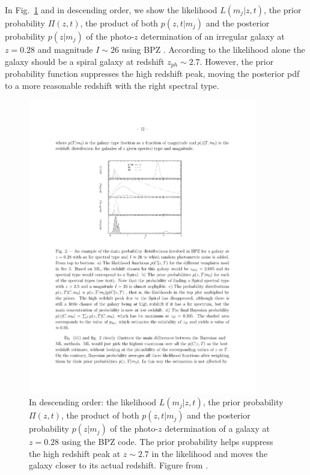 In Fig.~\ref{fig:prior_parts} and in descending order, we show the likelihood $L(m_j|z,t)$, the prior probability $\Pi(z,t)$, the product of both $p(z,t|m_j)$ and the posterior probability $p(z|m_j)$ of the photo-$z$ determination of an irregular galaxy at $z=0.28$ and magnitude $I\sim26$ using BPZ \citep{Benitez2000}. According to the likelihood alone the galaxy should be a spiral galaxy at redshift $z_{ph}\sim2.7$. However, the prior probability function suppresses the high redshift peak, moving the posterior pdf to a more reasonable redshift with the right spectral type.
\begin{figure}
\centering
\includegraphics[width=100mm]{./plots/prior.pdf}
\caption{In descending order: the likelihood $L(m_j|z,t)$, the prior probability $\Pi(z,t)$, the product of both $p(z,t|m_j)$ and the posterior probability $p(z|m_j)$ of the photo-$z$ determination of a galaxy at $z=0.28$ using the BPZ code. The prior probability helps suppress the high redshift peak at $z\sim2.7$ in the likelihood and moves the galaxy closer to its actual redshift. Figure from \citet{Benitez2000}.}
\label{fig:prior_parts}
\end{figure}

